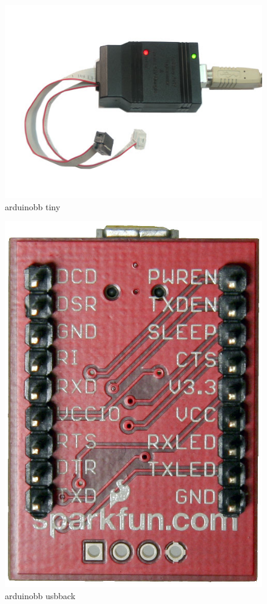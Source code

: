 \begin{figure}[!htb]
 \centering
 \includegraphics[scale=0.3]{img/arduino_breadboard/arduinobb_tiny.jpg}
 \caption{arduinobb tiny}
 \label{arduinobb tiny}
\end{figure}


\begin{figure}[!htb]
 \centering
 \includegraphics[scale=0.3]{img/arduino_breadboard/arduinobb_usbback.jpg}
 \caption{arduinobb usbback}
 \label{arduinobb usbback}
\end{figure}


